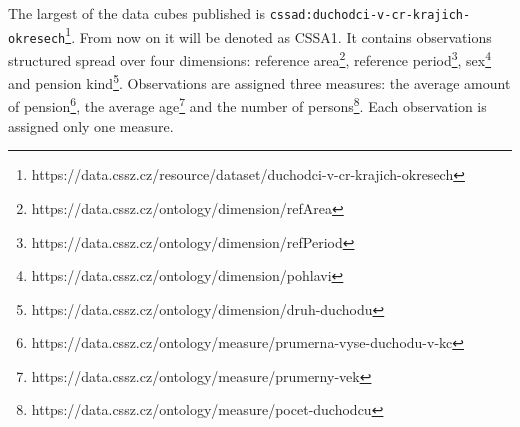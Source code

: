 
The largest of the data cubes published is \verb|cssad:duchodci-v-cr-krajich-okresech|\footnote{https://data.cssz.cz/resource/dataset/duchodci-v-cr-krajich-okresech}. From now on it will be denoted as CSSA1. It contains  observations structured spread over four dimensions: reference area\footnote{https://data.cssz.cz/ontology/dimension/refArea}, reference period\footnote{https://data.cssz.cz/ontology/dimension/refPeriod}, sex\footnote{https://data.cssz.cz/ontology/dimension/pohlavi} and pension kind\footnote{https://data.cssz.cz/ontology/dimension/druh-duchodu}. Observations are assigned three measures: the average amount of pension\footnote{https://data.cssz.cz/ontology/measure/prumerna-vyse-duchodu-v-kc}, the average age\footnote{https://data.cssz.cz/ontology/measure/prumerny-vek} and the number of persons\footnote{https://data.cssz.cz/ontology/measure/pocet-duchodcu}. Each observation is assigned only one measure.












